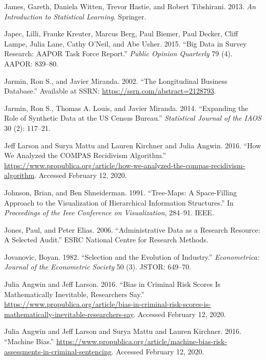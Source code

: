 \documentclass[]{krantz}
\begin{document}
\hypertarget{ref-james2013introduction}{}
James, Gareth, Daniela Witten, Trevor Hastie, and Robert Tibshirani.
2013. \emph{An Introduction to Statistical Learning}. Springer.

\hypertarget{ref-japec2015big}{}
Japec, Lilli, Frauke Kreuter, Marcus Berg, Paul Biemer, Paul Decker,
Cliff Lampe, Julia Lane, Cathy O'Neil, and Abe Usher. 2015. ``Big Data
in Survey Research: AAPOR Task Force Report.'' \emph{Public Opinion
Quarterly} 79 (4). AAPOR: 839--80.

\hypertarget{ref-jarmin2002longitudinal}{}
Jarmin, Ron S., and Javier Miranda. 2002. ``The Longitudinal Business
Database.'' Available at SSRN: \url{https://ssrn.com/abstract=2128793}.

\hypertarget{ref-jarmin2014expanding}{}
Jarmin, Ron S., Thomas A. Louis, and Javier Miranda. 2014. ``Expanding
the Role of Synthetic Data at the US Census Bureau.'' \emph{Statistical
Journal of the IAOS} 30 (2): 117--21.

\hypertarget{ref-larson2016}{}
Jeff Larson and Surya Mattu and Lauren Kirchner and Julia Angwin. 2016.
``How We Analyzed the COMPAS Recidivism Algorithm.''
\url{https://www.propublica.org/article/how-we-analyzed-the-compas-recidivism-algorithm}.
Accessed February 12, 2020.

\hypertarget{ref-johnson1991tree}{}
Johnson, Brian, and Ben Shneiderman. 1991. ``Tree-Maps: A Space-Filling
Approach to the Visualization of Hierarchical Information Structures.''
In \emph{Proceedings of the Ieee Conference on Visualization}, 284--91.
IEEE.

\hypertarget{ref-jones2006administrative}{}
Jones, Paul, and Peter Elias. 2006. ``Administrative Data as a Research
Resource: A Selected Audit.'' ESRC National Centre for Research Methods.

\hypertarget{ref-jovanovic1982selection}{}
Jovanovic, Boyan. 1982. ``Selection and the Evolution of Industry.''
\emph{Econometrica: Journal of the Econometric Society} 50 (3). JSTOR:
649--70.

\hypertarget{ref-angwin2016b}{}
Julia Angwin and Jeff Larson. 2016. ``Bias in Criminal Risk Scores Is
Mathematically Inevitable, Researchers Say.''
\url{https://www.propublica.org/article/bias-in-criminal-risk-scores-is-mathematically-inevitable-researchers-say}.
Accessed February 12, 2020.

\hypertarget{ref-angwin2016}{}
Julia Angwin and Jeff Larson and Surya Mattu and Lauren Kirchner. 2016.
``Machine Bias.''
\url{https://www.propublica.org/article/machine-bias-risk-assessments-in-criminal-sentencing}.
Accessed February 12, 2020.
\end{document}
